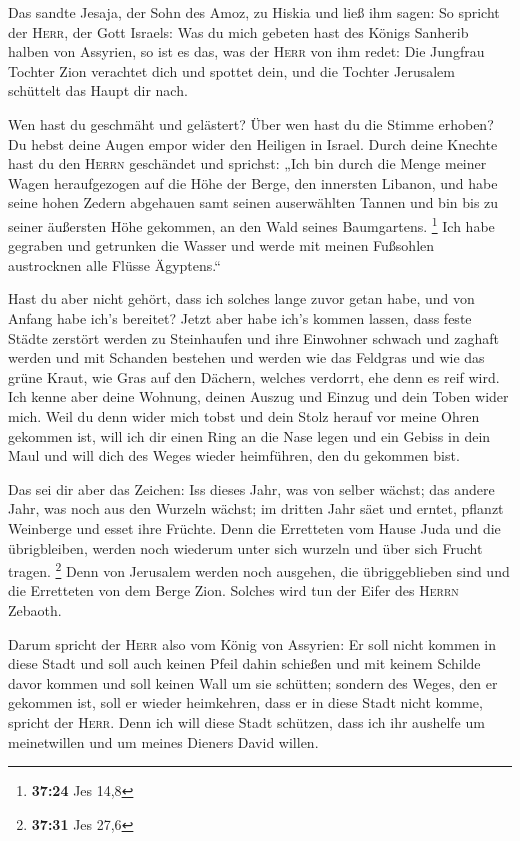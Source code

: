  Das sandte Jesaja, der Sohn des Amoz, zu Hiskia und ließ
ihm sagen: So spricht der \textsc{Herr}, der Gott Israels: Was du mich
gebeten hast des Königs Sanherib halben von Assyrien,  so
ist es das, was der \textsc{Herr} von ihm redet: Die Jungfrau Tochter
Zion verachtet dich und spottet dein, und die Tochter Jerusalem
schüttelt das Haupt dir nach.

 Wen hast du geschmäht und gelästert? Über wen hast du
die Stimme erhoben? Du hebst deine Augen empor wider den Heiligen in
Israel.  Durch deine Knechte hast du den \textsc{Herrn}
geschändet und sprichst: „Ich bin durch die Menge meiner Wagen
heraufgezogen auf die Höhe der Berge, den innersten Libanon, und habe
seine hohen Zedern abgehauen samt seinen auserwählten Tannen und bin bis
zu seiner äußersten Höhe gekommen, an den Wald seines Baumgartens.
\footnote{\textbf{37:24} Jes 14,8}  Ich habe gegraben und
getrunken die Wasser und werde mit meinen Fußsohlen austrocknen alle
Flüsse Ägyptens.``

 Hast du aber nicht gehört, dass ich solches lange zuvor
getan habe, und von Anfang habe ich's bereitet? Jetzt aber habe ich's
kommen lassen, dass feste Städte zerstört werden zu Steinhaufen
 und ihre Einwohner schwach und zaghaft werden und mit
Schanden bestehen und werden wie das Feldgras und wie das grüne Kraut,
wie Gras auf den Dächern, welches verdorrt, ehe denn es reif wird.
 Ich kenne aber deine Wohnung, deinen Auszug und Einzug
und dein Toben wider mich.  Weil du denn wider mich tobst
und dein Stolz herauf vor meine Ohren gekommen ist, will ich dir einen
Ring an die Nase legen und ein Gebiss in dein Maul und will dich des
Weges wieder heimführen, den du gekommen bist.

 Das sei dir aber das Zeichen: Iss dieses Jahr, was von
selber wächst; das andere Jahr, was noch aus den Wurzeln wächst; im
dritten Jahr säet und erntet, pflanzt Weinberge und esset ihre Früchte.
 Denn die Erretteten vom Hause Juda und die übrigbleiben,
werden noch wiederum unter sich wurzeln und über sich Frucht tragen.
\footnote{\textbf{37:31} Jes 27,6}  Denn von Jerusalem
werden noch ausgehen, die übriggeblieben sind und die Erretteten von dem
Berge Zion. Solches wird tun der Eifer des \textsc{Herrn} Zebaoth.

 Darum spricht der \textsc{Herr} also vom König von
Assyrien: Er soll nicht kommen in diese Stadt und soll auch keinen Pfeil
dahin schießen und mit keinem Schilde davor kommen und soll keinen Wall
um sie schütten;  sondern des Weges, den er gekommen ist,
soll er wieder heimkehren, dass er in diese Stadt nicht komme, spricht
der \textsc{Herr}.  Denn ich will diese Stadt schützen,
dass ich ihr aushelfe um meinetwillen und um meines Dieners David
willen.

